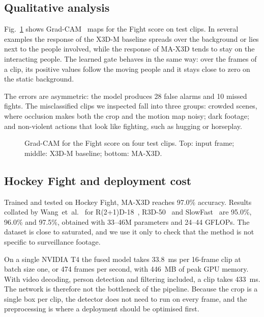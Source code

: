 \documentclass[conference]{IEEEtran}
\newif\ifdraft \drafttrue
\newcommand{\res}[1]{\ifdraft{\color{red}#1}\else#1\fi}
\begin{document}
\subsection{Qualitative analysis}

Fig.~\ref{fig:gradcam} shows Grad-CAM~\cite{gradcam} maps for the Fight
score on test clips. In several examples the response of the X3D-M
baseline spreads over the background or lies next to the people
involved, while the response of MA-X3D tends to stay on the interacting
people. The
learned gate behaves in the same way: over the frames of a clip, its
positive values follow the moving people and it stays close to zero on
the static background.

The errors are asymmetric: the model produces \res{28} false alarms and
\res{10} missed fights. The misclassified clips we inspected fall into
three groups: crowded scenes, where occlusion makes both the crop and
the motion map noisy; dark footage; and non-violent actions that look
like fighting, such as hugging or horseplay.

\begin{figure}[t]
  \centering
  \caption{Grad-CAM for the Fight score on four test clips. Top: input
  frame; middle: X3D-M baseline; bottom: MA-X3D.}
  \label{fig:gradcam}
\end{figure}

\subsection{Hockey Fight and deployment cost}

Trained and tested on Hockey Fight, MA-X3D reaches \res{97.0\%}
accuracy. Results collated by Wang~et~al.~\cite{biltma} for
R(2+1)D-18~\cite{r2plus1d}, R3D-50~\cite{r3d} and
SlowFast~\cite{slowfast} are 95.0\%, 96.0\% and 97.5\%, obtained with
33--46M parameters and 24--44 GFLOPs. The dataset is close to saturated,
and we use it only to check that the method is not specific to
surveillance footage.

On a single NVIDIA T4 the fused model takes \res{33.8}~ms per 16-frame
clip at batch size one, or \res{474} frames per second, with
\res{446}~MB of peak GPU memory. With video decoding, person detection
and filtering included, a clip takes \res{433}~ms. The network is
therefore not the bottleneck of the pipeline. Because the crop is a
single box per clip, the detector does not need to run on every frame,
and the preprocessing is where a deployment should be optimised first.
\end{document}
